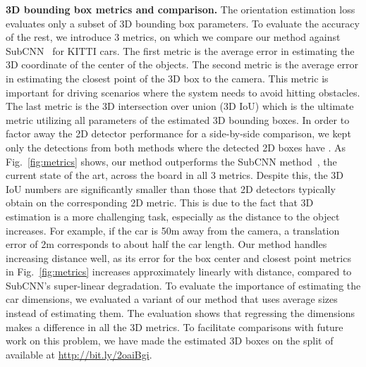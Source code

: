 \documentclass[10pt,twocolumn,letterpaper]{article}
\begin{document}
\noindent\textbf{3D bounding box metrics and comparison.}
The orientation estimation loss evaluates only a subset of 3D bounding box parameters. To evaluate the accuracy of the rest, we introduce 3 metrics, on which we compare our method against SubCNN~\cite{xiang2016subcategory} for KITTI cars.
The first metric is the average error in estimating the 3D coordinate of the center of the objects. The second metric is the average error in estimating the closest point of the 3D box to the camera. This metric is important for driving scenarios where the system needs to avoid hitting obstacles. The last metric is the 3D intersection over union (3D IoU) which is the ultimate metric utilizing all parameters of the estimated 3D bounding boxes. In order to factor away the 2D detector performance for a side-by-side comparison, we kept only the detections from both methods where the detected 2D boxes have . As Fig.~\ref{fig:metrics} shows, our method outperforms the SubCNN method~\cite{xiang2016subcategory}, the current state of the art, across the board in all 3 metrics. Despite this, the 3D IoU numbers are significantly smaller than those that 2D detectors typically obtain on the corresponding 2D metric. This is due to the fact that 3D estimation is a more challenging task, especially as the distance to the object increases. For example, if the car is 50m away from the camera, a translation error of 2m corresponds to about half the car length. Our method handles increasing distance well, as its error for the box center and closest point metrics in Fig.~\ref{fig:metrics} increases approximately linearly with distance, compared to SubCNN's super-linear degradation. To evaluate the importance of estimating the car dimensions, we evaluated a variant of our method that uses average sizes instead of estimating them. The evaluation shows that regressing the dimensions makes a difference in all the 3D metrics.
To facilitate comparisons with future work on this problem, we have made the estimated 3D boxes on the split of \cite{3DVP15} available at \url{http://bit.ly/2oaiBgi}.
\end{document}
